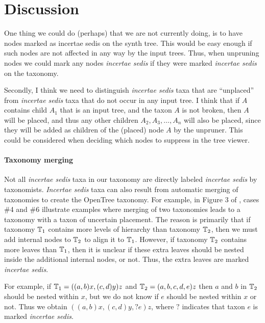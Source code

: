 \documentclass[english]{article}
\begin{document}
\section{Discussion}

One thing we could do (perhaps) that we are not currently doing, is to
have nodes marked as incertae sedis on the synth tree.
This would be
easy enough if such nodes are not affected in any way by the input
trees.
Thus, when unpruning nodes we could mark any nodes
\emph{incertae sedis} if they were marked \emph{incertae sedis} on the
taxonomy.

Secondly, I think we need to distinguish \emph{incertae sedis} taxa
that are ``unplaced'' from \emph{incertae sedis} taxa that do not
occur in any input tree.
I think that if $A$ contains child $A_{1}$
that is an input tree, and the taxon $A$ is not broken, then $A$ will
be placed, and thus any other children $A_{2},A_{3},\ldots,A_{n}$ will
also be placed, since they will be added as children of the (placed)
node $A$ by the unpruner.
This could be considered when deciding which
nodes to suppress in the tree viewer.

\paragraph{Taxonomy merging}

Not all \emph{incertae sedis} taxa in our taxonomy are directly
labeled \emph{incertae sedis} by taxonomists.
\emph{Incertae sedis}
taxa can also result from automatic merging of taxonomies to create
the OpenTree taxonomy.
For example, in Figure 3 of
\citet{rees2017automated}, cases \#4 and \#6 illustrate examples where
merging of two taxonomies leads to a taxonomy with a taxon of
uncertain placement.
The reason is primarily that if taxonomy
$\mbox{\ensuremath{\mathbb{T}}}_{1}$ contains more levels of hierarchy than taxonomy
$\mbox{\ensuremath{\mathbb{T}}}_{2}$, then we must add internal nodes to $\mbox{\ensuremath{\mathbb{T}}}_{2}$ to
align it to $\mbox{\ensuremath{\mathbb{T}}}_{1}$.
However, if taxonomy $\mbox{\ensuremath{\mathbb{T}}}_{2}$
contains more leaves than $\mbox{\ensuremath{\mathbb{T}}}_{1}$, then it is unclear if these
extra leaves should be nested inside the additional internal nodes, or
not.
Thus, the extra leaves are marked \emph{incertae sedis}.

For example, if $\mbox{\ensuremath{\mathbb{T}}}_{1}=((a,b)x,(c,d)y)z$ and
$\mbox{\ensuremath{\mathbb{T}}}_{2}=(a,b,c,d,e)z$ then $a$ and $b$ in $\mbox{\ensuremath{\mathbb{T}}}_{2}$
should be nested within $x$, but we do not know if $e$ should be
nested within $x$ or not.
Thus we obtain $((a,b)x,(c,d)y,?e)z$, where
$?$ indicates that taxon $e$ is marked \emph{incertae sedis}.
\end{document}
